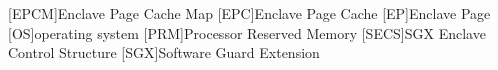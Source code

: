 \begin{acronym}[EPCM]
    [EPCM]{Enclave Page Cache Map}
    [EPC]{Enclave Page Cache}
    [EP]{Enclave Page}
    [OS]{operating system}
    [PRM]{Processor Reserved Memory}
    [SECS]{SGX Enclave Control Structure}
    [SGX]{Software Guard Extension}
\end{acronym}
